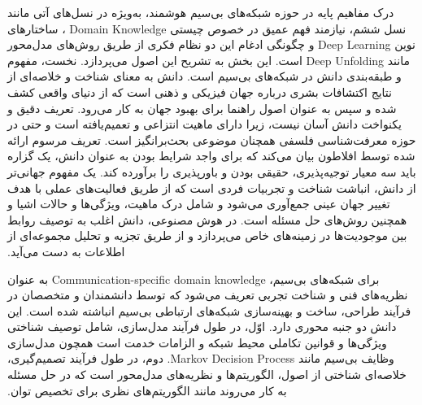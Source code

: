 ‫درک مفاهیم پایه در حوزه شبکه‌های بی‌سیم هوشمند، به‌ویژه در نسل‌های آتی مانند نسل ششم، نیازمند فهم عمیق در خصوص چیستی 
\gls{Domain Knowledge}
، ساختارهای نوین 
\gls{Deep Learning}
و چگونگی ادغام این دو نظام فکری از طریق روش‌های مدل‌محور مانند 
\gls{Deep Unfolding}
 است. این بخش به تشریح این اصول می‌پردازد.‬
نخست، مفهوم و طبقه‌بندی دانش در شبکه‌های بی‌سیم‬ است.
‫دانش به معنای شناخت و خلاصه‌ای از نتایج اکتشافات بشری درباره جهان فیزیکی و ذهنی است که از دنیای واقعی کشف شده و سپس به عنوان اصول راهنما برای بهبود جهان به کار می‌رود. تعریف دقیق و یکنواخت دانش آسان نیست، زیرا دارای ماهیت انتزاعی و تعمیم‌یافته است و حتی در حوزه معرفت‌شناسی فلسفی همچنان موضوعی بحث‌برانگیز است. تعریف مرسوم ارائه شده توسط افلاطون بیان می‌کند که برای واجد شرایط بودن به عنوان دانش، یک گزاره باید سه معیار توجیه‌پذیری، حقیقی بودن و باورپذیری را برآورده کند. یک مفهوم جهانی‌تر از دانش، انباشت شناخت و تجربیات فردی است که از طریق فعالیت‌های عملی با هدف تغییر جهان عینی جمع‌آوری می‌شود و شامل درک ماهیت، ویژگی‌ها و حالات اشیا و همچنین روش‌های حل مسئله است. در هوش مصنوعی، دانش اغلب به توصیف روابط بین موجودیت‌ها در زمینه‌های خاص می‌پردازد و از طریق تجزیه و تحلیل مجموعه‌ای از اطلاعات به دست می‌آید.‬

‫برای شبکه‌های بی‌سیم، 
\gls{Communication-specific domain knowledge}
به عنوان نظریه‌های فنی و شناخت تجربی تعریف می‌شود که توسط دانشمندان و متخصصان در فرآیند طراحی، ساخت و بهینه‌سازی شبکه‌های ارتباطی بی‌سیم انباشته شده است. این دانش دو جنبه محوری دارد. اوّل، در طول فرآیند مدل‌سازی، شامل توصیف شناختی ویژگی‌ها و قوانین تکاملی محیط شبکه و الزامات خدمت است همچون مدل‌سازی وظایف بی‌سیم مانند 
\gls{Markov Decision Process}.
 دوم، در طول فرآیند تصمیم‌گیری، خلاصه‌ای شناختی از اصول، الگوریتم‌ها و نظریه‌های مدل‌محور است که در حل مسئله به کار می‌روند مانند الگوریتم‌های نظری برای تخصیص توان.‬

